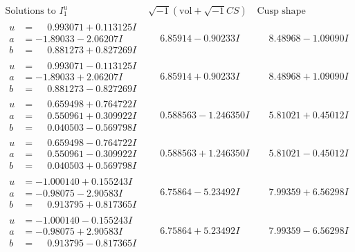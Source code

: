 \documentclass[1p]{elsarticle_modified}
\theoremstyle{definition}
\newcommand{\I}{\sqrt{-1}}
\begin{document}
$$\begin{array}{c|c|c}  
\text{Solutions to }I^u_{1}& \I (\text{vol} + \sqrt{-1}CS) & \text{Cusp shape}\\
 \hline 
\begin{aligned}
u &= \phantom{-}0.993071 + 0.113125 I \\
a &= -1.89033 - 2.06207 I \\
b &= \phantom{-}0.881273 + 0.827269 I\end{aligned}
 & \phantom{-}6.85914 - 0.90233 I & \phantom{-}8.48968 - 1.09090 I \\ \hline\begin{aligned}
u &= \phantom{-}0.993071 - 0.113125 I \\
a &= -1.89033 + 2.06207 I \\
b &= \phantom{-}0.881273 - 0.827269 I\end{aligned}
 & \phantom{-}6.85914 + 0.90233 I & \phantom{-}8.48968 + 1.09090 I \\ \hline\begin{aligned}
u &= \phantom{-}0.659498 + 0.764722 I \\
a &= \phantom{-}0.550961 + 0.309922 I \\
b &= \phantom{-}0.040503 - 0.569798 I\end{aligned}
 & \phantom{-}0.588563 - 1.246350 I & \phantom{-}5.81021 + 0.45012 I \\ \hline\begin{aligned}
u &= \phantom{-}0.659498 - 0.764722 I \\
a &= \phantom{-}0.550961 - 0.309922 I \\
b &= \phantom{-}0.040503 + 0.569798 I\end{aligned}
 & \phantom{-}0.588563 + 1.246350 I & \phantom{-}5.81021 - 0.45012 I \\ \hline\begin{aligned}
u &= -1.000140 + 0.155243 I \\
a &= -0.98075 - 2.90583 I \\
b &= \phantom{-}0.913795 + 0.817365 I\end{aligned}
 & \phantom{-}6.75864 - 5.23492 I & \phantom{-}7.99359 + 6.56298 I \\ \hline\begin{aligned}
u &= -1.000140 - 0.155243 I \\
a &= -0.98075 + 2.90583 I \\
b &= \phantom{-}0.913795 - 0.817365 I\end{aligned}
 & \phantom{-}6.75864 + 5.23492 I & \phantom{-}7.99359 - 6.56298 I \\ \hline\begin{aligned}

\end{aligned}
\end{array}$$
\end{document}
